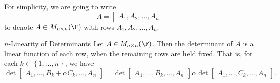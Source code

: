 \documentclass[linearalgebra]{subfiles}
\begin{document}
    \begin{remark}
        For simplicity, we are going to write
        \begin{equation*}
            A = \begin{bmatrix} A_1, A_2, \ldots, A_n \end{bmatrix}
        \end{equation*}
        to denote $A\in M_{n\times n}(\F)$ with rows $A_1, A_2, \ldots, A_n$.
    \end{remark}

    \begin{prop}{$n$-Linearity of Determinants}
        Let $A\in M_{n\times n}(\F)$. Then the determinant of $A$ is a linear function of each row, when the remaining rows are held fixed. That is, for each $k\in \left\lbrace 1, \ldots, n \right\rbrace$, we have
        \begin{equation*}
            \det 
            \begin{bmatrix}
                A_1, \ldots, B_k + \alpha C_k, \ldots, A_n
            \end{bmatrix}
            =
            \det 
            \begin{bmatrix}
                A_1, \ldots,  B_k, \ldots, A_n
            \end{bmatrix}
            \alpha \det 
            \begin{bmatrix}
                A_1, \ldots, C_k, \ldots, A_n
            \end{bmatrix}.
        \end{equation*}
    \end{prop}
\end{document}
